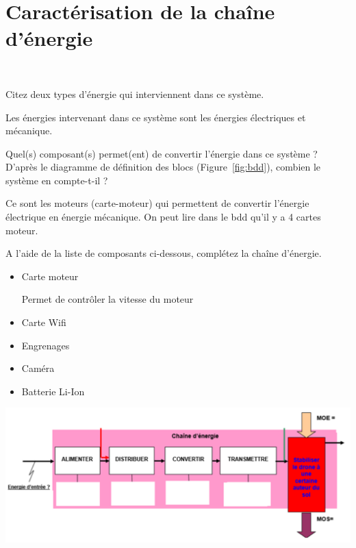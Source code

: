 \documentclass[10pt,fleqn]{article} %
\begin{document}
\section{Caractérisation de la chaîne d'énergie}
\begin{exercise}~

\begin{question}
  Citez deux types d'énergie qui interviennent dans ce système.
\end{question}
\begin{solution}
  Les énergies intervenant dans ce système sont les énergies électriques et mécanique.
\end{solution}

\begin{question}
    Quel(s) composant(s) permet(ent) de convertir l'énergie dans ce système ? D'après le diagramme de définition des blocs (Figure~\ref{fig:bdd}), combien le système en compte-t-il ?
\end{question}
\begin{solution}
  Ce sont les moteurs (carte-moteur) qui permettent de convertir l'énergie électrique en énergie mécanique. On peut lire dans le bdd qu'il y a 4 cartes moteur.
\end{solution}

\begin{question}
    A l'aide de la liste de composants ci-dessous, complétez la chaîne d'énergie.
    \begin{itemize}
        \item Carte moteur
        \begin{itemize}
            \itemf Permet de contrôler la vitesse du moteur
        \end{itemize}
        \item Carte Wifi
        \item Engrenages
        \item Caméra
        \item Batterie Li-Ion
    \end{itemize}

    \includegraphics[width=\textwidth]{images/chaineenergie.png}
\end{question}
\end{exercise}
\pagebreak
\end{document}
